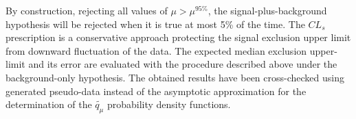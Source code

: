 By construction, rejecting all values of $\mu > \mu^{95\%}$, the signal-plus-background hypothesis will be 
rejected when it is true at most 5\% of the time.
The $CL_{s}$ prescription is a conservative approach protecting the signal exclusion upper limit from  downward  fluctuation of the data.
%
%	
%
The expected median exclusion upper-limit and its error are evaluated with the procedure described above under the background-only hypothesis.
The obtained results have been cross-checked using generated pseudo-data instead of the asymptotic approximation for the determination
of the $\tilde{q_{\mu}}$ probability density functions. 


